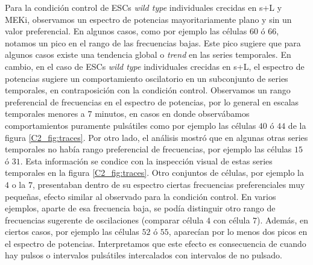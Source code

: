 \documentclass[./main.tex]{subfiles}
\begin{document}
Para la condición control de ESCs \textit{wild type} individuales crecidas en s+L y MEKi, observamos un espectro de potencias mayoritariamente plano y sin un valor preferencial. En algunos casos, como por ejemplo las células $60$ ó $66$, notamos un pico en el rango de las frecuencias bajas. Este pico sugiere que para algunos casos existe una tendencia global o \textit{trend} en las series temporales. En cambio, en el caso de ESCs \textit{wild type} individuales crecidas en s+L, el espectro de potencias sugiere un comportamiento oscilatorio en un subconjunto de series temporales, en contraposición con la condición control. Observamos un rango preferencial de frecuencias en el espectro de potencias, por lo general en escalas temporales menores a $7$ minutos, en casos en donde observábamos comportamientos puramente pulsátiles como por ejemplo las células $40$ ó $44$ de la figura \ref{C2_fig:traces}. Por otro lado, el análisis mostró que en algunas otras series temporales no había rango preferencial de frecuencias, por ejemplo las células $15$ ó $31$. Esta información se condice con la inspección visual de estas series temporales en la figura \ref{C2_fig:traces}. Otro conjuntos de células, por ejemplo la $4$ o la $7$, presentaban dentro de su espectro ciertas frecuencias preferenciales muy pequeñas, efecto similar al observado para la condición control. En varios ejemplos, aparte de esa frecuencia baja, se podía distinguir otro rango de frecuencias sugerente de oscilaciones (comparar célula $4$ con célula $7$). Además, en ciertos casos, por ejemplo las células $52$ ó $55$, aparecían por lo menos dos picos en el espectro de potencias. Interpretamos que este efecto es consecuencia de cuando hay pulsos o intervalos pulsátiles intercalados con intervalos de no pulsado. 
\end{document}
